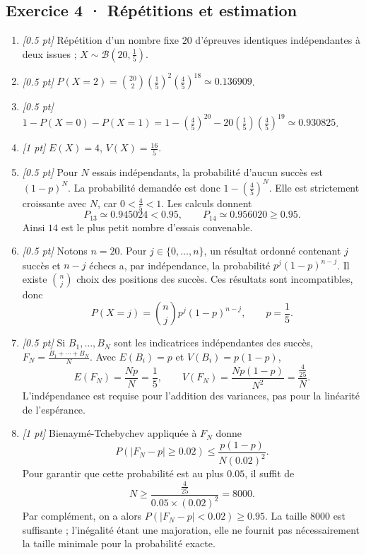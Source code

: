\subsection*{Exercice 4 · Répétitions et estimation}\begin{enumerate}

\item \textit{[\num{0,5} pt]} Répétition d'un nombre fixe $20$ d'épreuves identiques indépendantes à deux issues ; $X\sim\mathcal B(20,\frac{1}{5})$.

\item \textit{[\num{0,5} pt]} $P(X=2)=\binom{20}2(\frac{1}{5})^2(\frac{4}{5})^{18}\simeq\num{0,136909}$.

\item \textit{[\num{0,5} pt]} $1-P(X=0)-P(X=1)=1-(\frac{4}{5})^{20}-20(\frac{1}{5})(\frac{4}{5})^{19}\simeq\num{0,930825}$.

\item \textit{[1 pt]} $E(X)=4$, $V(X)=\frac{16}{5}$.

\item \textit{[\num{0,5} pt]} Pour $N$ essais indépendants, la probabilité d'aucun succès est $(1-p)^N$. La probabilité demandée est donc $1-(\frac{4}{5})^N$. Elle est strictement croissante avec $N$, car $0<\frac{4}{5}<1$. Les calculs donnent
\[P_{13}\simeq\num{0,945024}<\num{0,95},\qquad P_{14}\simeq\num{0,956020}\ge\num{0,95}.\]
Ainsi $14$ est le plus petit nombre d'essais convenable.

\item \textit{[\num{0,5} pt]} Notons $n=20$. Pour $j\in\{0,\ldots,n\}$, un résultat ordonné contenant $j$ succès et $n-j$ échecs a, par indépendance, la probabilité $p^j(1-p)^{n-j}$. Il existe $\binom nj$ choix des positions des succès. Ces résultats sont incompatibles, donc
\[P(X=j)=\binom nj p^j(1-p)^{n-j},\qquad p=\frac{1}{5}.\]

\item \textit{[\num{0,5} pt]} Si $B_1,\ldots,B_N$ sont les indicatrices indépendantes des succès, $F_N=\frac{B_1+\cdots+B_N}{N}$. Avec $E(B_i)=p$ et $V(B_i)=p(1-p)$,
\[E(F_N)=\frac{Np}{N}=\frac{1}{5},\qquad V(F_N)=\frac{Np(1-p)}{N^2}=\frac{\frac{4}{25}}{N}.\]
L'indépendance est requise pour l'addition des variances, pas pour la linéarité de l'espérance.

\item \textit{[1 pt]} Bienaymé-Tchebychev appliquée à $F_N$ donne
\[P(|F_N-p|\ge\num{0,02})\le\frac{p(1-p)}{N(\num{0,02})^2}.\]
Pour garantir que cette probabilité est au plus $\num{0,05}$, il suffit de
\[N\ge\frac{\frac{4}{25}}{\num{0,05}\times(\num{0,02})^2}=8000.\]
Par complément, on a alors $P(|F_N-p|<\num{0,02})\ge\num{0,95}$. La taille $8000$ est suffisante ; l'inégalité étant une majoration, elle ne fournit pas nécessairement la taille minimale pour la probabilité exacte.

\end{enumerate}

